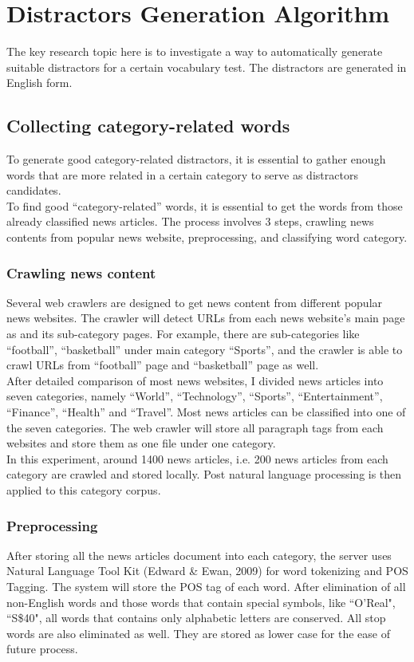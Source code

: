 \section{Distractors Generation Algorithm}
The key research topic here is to investigate a way to automatically generate suitable distractors for a certain vocabulary test. The distractors are generated in English form.
\subsection{Collecting category-related words}
To generate good category-related distractors, it is essential to gather enough words that are more related in a certain category to serve as distractors candidates.
\\
To find good “category-related” words, it is essential to get the words from those already classified news articles. The process involves 3 steps, crawling news contents from popular news website, preprocessing, and classifying word category.
\\
\subsubsection{Crawling news content}
Several web crawlers are designed to get news content from different popular news websites. The crawler will detect URLs from each news website’s main page as and its sub-category pages. For example, there are sub-categories like “football”, “basketball” under main category “Sports”, and the crawler is able to crawl URLs from “football” page and “basketball” page as well. 
\\
After detailed comparison of most news websites, I divided news articles into seven categories, namely “World”, “Technology”, “Sports”, “Entertainment”, “Finance”, “Health” and “Travel”. Most news articles can be classified into one of the seven categories. The web crawler will store all paragraph tags from each websites and store them as one file under one category. 
\\
In this experiment, around 1400 news articles, i.e. 200 news articles from each category are crawled and stored locally. Post natural language processing is then applied to this category corpus.
\\
\subsubsection{Preprocessing}
After storing all the news articles document into each category, the server uses Natural Language Tool Kit (Edward & Ewan, 2009) for word tokenizing and POS Tagging. The system will store the POS tag of each word. After elimination of all non-English words and those words that contain special symbols, like ``O’Real", ``S\$40", all words that contains only alphabetic letters are conserved. All stop words are also eliminated as well. They are stored as lower case for the ease of future process.
\\
